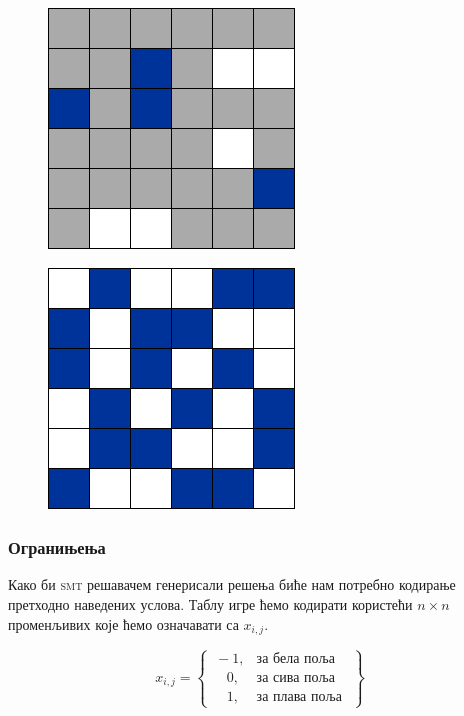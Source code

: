 \documentclass[a4paper]{article}
\begin{document}
\begin{figure}
\centering
\begin{minipage}{.5\textwidth}
    \centering
    \includegraphics[width=.4\linewidth]{./slike/three_way_original.png}
    \label{fig:threeway_original}
\end{minipage}%
\begin{minipage}{.5\textwidth}
  \centering
  \includegraphics[width=.4\linewidth]{./slike/three_way_solved.png}
  \label{fig:threeway_solved}
\end{minipage}
\end{figure}

\subsubsection{Огранињења}
Како би \textsc{smt} решавачем генерисали решења биће нам потребно кодирање претходно наведених услова. Таблу игре
ћемо кодирати користећи $n \times n$ променљивих које ћемо означавати са $x_{i, j}$.

\[
    x_{i, j} = \left\{\begin{array}{lr}
        \, -1, & \text{за бела поља} \\
        \quad 0, & \text{за сива поља } \\
        \quad 1, & \text{за плава поља }
    \end{array}\right\}
\]
\end{document}
